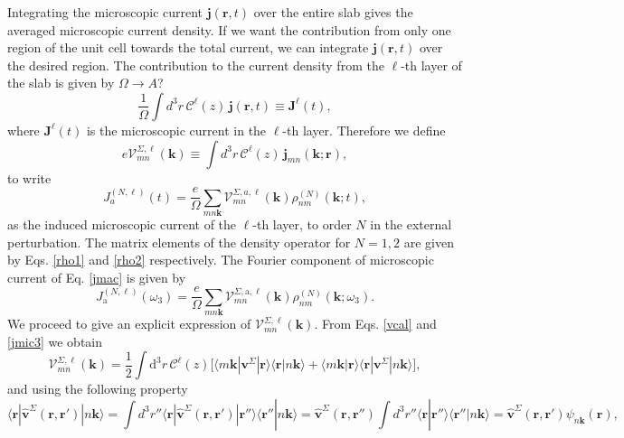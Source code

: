 Integrating the microscopic current $\mathbf{j}(\mathbf{r},t)$ over
the entire slab gives the averaged microscopic current density. 
If we want the contribution from only one region of the unit cell 
towards the total current, we can integrate $\mathbf{j}({\mathbf r},t)$ 
over the desired region. The contribution to the current density from the
$\ell$-th layer of the slab is given by
{\color{red} $\Omega \rightarrow A$?}
\begin{equation}\label{jsz}
\frac{1}{\Omega}\int d^3r\, \mathcal{C}^{\ell}(z)\, \mathbf{j}(\mathbf{r},t)
 \equiv \mathbf{J}^{\ell}(t),
\end{equation}
where $\mathbf{J}^{\ell}(t)$ is the microscopic current in the
$\ell$-th layer.
Therefore we define
\begin{equation}\label{vcal}
e{\boldsymbol{\mathcal{V}}}^{\Sigma,\ell}_{mn}(\mathbf{k})
\equiv
\int d^3r\, \mathcal{C}^{\ell}(z)\,\mathbf{j}_{mn}({\mathbf{k}};\mathbf{r}),
\end{equation}
to write
\begin{equation}\label{jmac}
J_a^{(N,\ell)}(t)=\frac{e}{\Omega}
\sum_{mn\mathbf{k}}
\mathcal{V}^{\Sigma,a,\ell}_{mn}(\mathbf{k})
\rho^{(N)}_{nm}(\mathbf{k};t),
\end{equation}
as the induced microscopic current of the $\ell$-th layer, to order $N$ 
in the external perturbation. The matrix elements of the 
density operator for $N=1,2$ are given by Eqs. \eqref{rho1} and
\eqref{rho2} respectively. 
The Fourier component of microscopic current of Eq. \eqref{jmac} is given by
\begin{equation}\label{jmac2}
J_{\mathrm{a}}^{(N,\ell)}(\omega_3)=\frac{e}{\Omega}
\sum_{mn\mathbf{k}}
\mathcal{V}^{\Sigma,\mathrm{a},\ell}_{mn}(\mathbf{k})
\rho^{(N)}_{nm}(\mathbf{k};\omega_3)
.
\end{equation}
We proceed to give an explicit expression of
$\boldsymbol{\mathcal{V}}^{\Sigma,\ell}_{mn}(\mathbf{k})$.
From
Eqs. \eqref{vcal} and \eqref{jmic3} we obtain
\begin{equation}\label{intj}
{\boldsymbol{\mathcal{V}}}^{\Sigma,\ell}_{mn}({\mathbf k})=
\frac{1}{2}
\int \mathrm{d}^3 r\,
 \mathcal{C}^{\ell}(z)
\bigg[
\langle m\mathbf{k}|\mathbf{v}^\Sigma | \mathbf{r}\rangle
\langle \mathbf{r} | n \mathbf k \rangle +
\langle m\mathbf{k} | \mathbf{r}\rangle
\langle \mathbf{r} | \mathbf{v}^\Sigma | n \mathbf k \rangle\bigg]
,
\end{equation}  
and using the following property
\begin{equation}\label{nl.2}
\langle \mathbf{r} | \hat{\mathbf{v}}^{\Sigma}(\mathbf{r},\mathbf{r}')| n\mathbf{k} \rangle
=\int d^3 r'' \langle\mathbf{r}|\hat{\mathbf{v}}^{\Sigma}(\mathbf{r},\mathbf{r}')|\mathbf{r}''\rangle
\langle\mathbf{r}''|n\mathbf{k}\rangle
=\hat{\mathbf{v}}^{\Sigma}(\mathbf{r},\mathbf{r}'')
\int d^3 r'' \langle\mathbf{r}|\mathbf{r}''\rangle
\langle\mathbf{r}''|n\mathbf{k}\rangle
=\hat{\mathbf{v}}^{\Sigma}(\mathbf{r},\mathbf{r}')
\psi_{n\mathbf{k}}(\mathbf{r})
,
\end{equation}
